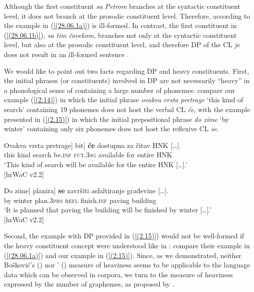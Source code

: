 \noindent
Although the first constituent \textit{sa Petrom} branches at the syntactic constituent level, it does not branch at the prosodic constituent level. Therefore, according to \citet[374]{InkelasZec90} the example in (\ref{(28.06.1a)}) is ill-formed. In contrast, the first constituent in (\ref{(28.06.1b)}), \textit{sa tim čovekom}, branches not only at the syntactic constituent level, but also at the prosodic constituent level, and therefore DP of the CL \textit{je} does not result in an ill-formed sentence \citep[374]{InkelasZec90}.

We would like to point out two facts regarding DP and heavy constituents. First, the initial phrases (or constituents) involved in DP are not necessarily ``heavy'' in a phonological sense of containing a large number of phonemes: compare our example (\ref{(2.14)}) in which the initial phrase \textit{o\-va\-kva} \textit{vrsta} \textit{pretrage} `this kind of search' containing 19 phonemes does not host the verbal CL \textit{će}, with the example presented in (\ref{(2.15)}) in which the initial prepositional phrase \textit{do zime} `by winter' containing only six phonemes does not host the reflexive CL \textit{se}.  

\begin{exe}\ex\label{(2.14)}
\gll \minsp{[} Ovakva vrsta pretrage] \minsp{[} bit] \textbf{će} dostupna za čitav {HNK [\dots].} \\
{} this kind search {} be\textsc{.inf} \textsc{fut.3sg} available for entire HNK\\
\glt ‘This kind of search will be available for the entire HNK [\dots].’\\
\hfill [hrWaC v2.2]

\ex\label{(2.15)}
\gll \minsp{[} Do zime] \minsp{[} planira] \textbf{se} završiti asfaltiranje građevine [\dots].\\
{} by winter {} plan\textsc{.3prs} \textsc{refl} finish\textsc{.inf} paving building \\
\glt ‘It is planned that paving the building will be finished by winter [\dots].’\\
\hfill [hrWaC v2.2]\\
\end{exe}

\noindent Second, the example with DP provided in (\ref{(2.15)}) would not be well-formed if the heavy constituent concept were understood like in \citet[374f]{InkelasZec90}: compare their example in (\ref{(28.06.1a)}) and our example in (\ref{(2.15)}). Since, as we demonstrated, neither Bošković's (\citeyear[264]{Boskovic95}) nor \citeauthor{InkelasZec90}' (\citeyear[373ff]{InkelasZec90}) measure of heaviness seems to be applicable to the language data which can be observed in corpora, we turn to the measure of heaviness expressed by the number of graphemes, as proposed by \citet{KCN18}. 

